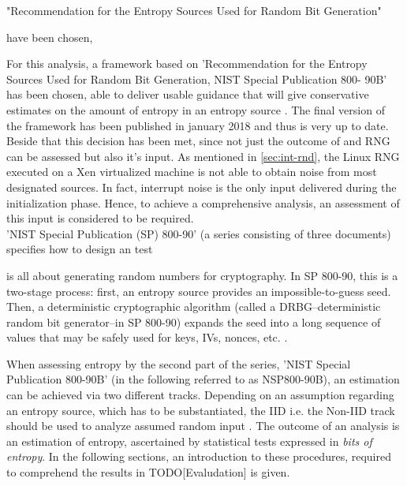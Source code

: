 "Recommendation for the Entropy Sources Used for Random Bit Generation"

have been chosen, 


For this analysis, a framework based on 'Recommendation for the Entropy Sources Used for Random Bit Generation, NIST Special Publication 800- 90B' \cite{turan2018nist} has been chosen, able to deliver
usable guidance that will give conservative estimates on the amount of entropy in an entropy
source \cite{turan2015random}. The final version of the framework has been published in january 2018 and thus is very up to date. Beside that this decision has been met, since not just the outcome of and RNG can be assessed but also it's input. As mentioned in \ref{sec:int-rnd}, the Linux RNG executed on a Xen virtualized machine is not able to obtain noise from most designated sources. In fact, interrupt noise is the only input delivered during the initialization phase. Hence, to achieve a comprehensive analysis, an assessment of this input is considered to be required.\\
'NIST Special Publication (SP) 800-90' (a series consisting of three documents) specifies how to design an test 

 is all about
generating random numbers for cryptography. In SP 800-90, this is a two-stage process: first, an
entropy source provides an impossible-to-guess seed. Then, a deterministic cryptographic
algorithm (called a DRBG--deterministic random bit generator--in SP 800-90) expands the seed
into a long sequence of values that may be safely used for keys, IVs, nonces, etc.
\cite{turan2015random}.



 When assessing entropy by the second part of the series, 'NIST Special Publication 800-90B' (in the following referred to as NSP800-90B), an estimation can be achieved via 
two different tracks. Depending on an assumption regarding an entropy source, which has to be substantiated, the IID i.e. the Non-IID track should be used to analyze assumed random input 
\cite{turan2018nist}. The outcome of an analysis is an estimation of entropy, ascertained by statistical tests expressed in \textit{bits of entropy}. In the following sections, an introduction to these procedures, required to comprehend the results in TODO[Evaludation] is given.




